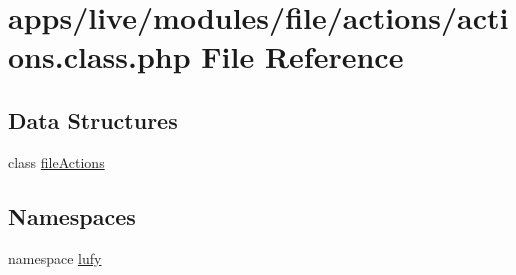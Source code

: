 \hypertarget{live_2modules_2file_2actions_2actions_8class_8php}{\section{apps/live/modules/file/actions/actions.class.\-php File Reference}
\label{live_2modules_2file_2actions_2actions_8class_8php}
}
\subsection*{Data Structures}
\begin{DoxyCompactItemize}
\item 
class \hyperlink{classfile_actions}{file\-Actions}
\end{DoxyCompactItemize}
\subsection*{Namespaces}
\begin{DoxyCompactItemize}
\item 
namespace \hyperlink{namespacelufy}{lufy}
\end{DoxyCompactItemize}
